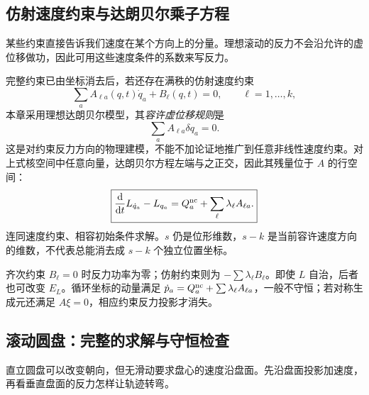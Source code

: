 \subsection{仿射速度约束与达朗贝尔乘子方程}
某些约束直接告诉我们速度在某个方向上的分量。理想滚动的反力不会沿允许的虚位移做功，因此可用这些速度条件的系数来写反力。

完整约束已由坐标消去后，若还存在满秩的仿射速度约束
\begin{equation}\label{eq:nonholonomic-constraint}
\sum_a A_{\ell a}(q,t)\dot q_a+B_\ell(q,t)=0,
\qquad\ell=1,\ldots,k,
\end{equation}
本章采用理想达朗贝尔模型，其\emph{容许虚位移规则}是
\begin{equation}\label{eq:nonholonomic-virtual}
\sum_a A_{\ell a}\delta q_a=0.
\end{equation}
这是对约束反力方向的物理建模，不能不加论证地推广到任意非线性速度约束。对上式核空间中任意向量，达朗贝尔方程左端与之正交，因此其残量位于 $A$ 的行空间：
\begin{equation}\label{eq:lagrange-multipliers}
\boxed{\frac{\mathrm{d}}{\mathrm{d} t}L_{\dot q_a}-L_{q_a}
=Q_a^{\rm nc}+\sum_\ell\lambda_\ell A_{\ell a}.}
\end{equation}
连同速度约束、相容初始条件求解。$s$ 仍是位形维数，$s-k$ 是当前容许速度方向的维数，不代表总能消去成 $s-k$ 个独立位置坐标。

齐次约束 $B_\ell=0$ 时反力功率为零；仿射约束则为 $-\sum\lambda_\ell B_\ell$。即使 $L$ 自治，后者也可改变 $E_L$。循环坐标的动量满足 $\dot p_a=Q_a^{\rm nc}+\sum\lambda_\ell A_{\ell a}$，一般不守恒；若对称生成元还满足 $A\xi=0$，相应约束反力投影才消失。

\subsection{滚动圆盘：完整的求解与守恒检查}
直立圆盘可以改变朝向，但无滑动要求盘心的速度沿盘面。先沿盘面投影加速度，再看垂直盘面的反力怎样让轨迹转弯。

